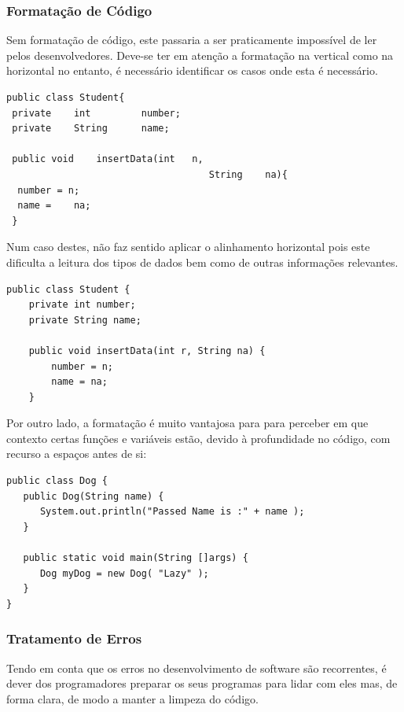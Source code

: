 \documentclass[10pt,portuguese]{article}
\begin{document}
\subsubsection{Formatação de Código}

\par Sem formatação de código, este passaria a ser praticamente impossível de ler pelos desenvolvedores. Deve-se ter em atenção a formatação na vertical como na horizontal no entanto, é necessário identificar os casos onde esta é necessário.

\begin{lstlisting}
public class Student{  
 private    int         number;  
 private    String      name; 
 
 public void    insertData(int   n, 
                                    String    na){  
  number = n;  
  name =    na;  
 }  
\end{lstlisting}

\Par Num caso destes, não faz sentido aplicar o alinhamento horizontal pois este dificulta a leitura dos tipos de dados bem como de outras informações relevantes.

\begin{lstlisting}
public class Student {
    private int number;
    private String name;

    public void insertData(int r, String na) {
        number = n;
        name = na;
    }
\end{lstlisting}

\Par Por outro lado, a formatação é muito vantajosa para para perceber em que contexto certas funções e variáveis estão, devido à profundidade no código, com recurso a espaços antes de si:

\begin{lstlisting}
public class Dog {
   public Dog(String name) {
      System.out.println("Passed Name is :" + name );
   }

   public static void main(String []args) {
      Dog myDog = new Dog( "Lazy" );
   }
}
\end{lstlisting}

\subsubsection{Tratamento de Erros}

\Par Tendo em conta que os erros no desenvolvimento de software são recorrentes, é dever dos programadores preparar os seus programas para lidar com eles mas, de forma clara, de modo a manter a limpeza do código.
\end{document}
